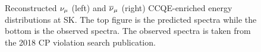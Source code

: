 \begin{figure}
\begin{centering}
\par\end{centering}
\begin{centering}
\par\end{centering}
\caption[Reconstructed $\numu$ and $\numubar$ CCQE-enriched Energy Distributions
at SK]{Reconstructed $\protect\nu_{\mu}$ (left) and $\protect\overline{\nu}_{\mu}$ (right)
CCQE-enriched energy distributions at SK. The top figure is the predicted
spectra while the bottom is the observed spectra. The observed spectra
is taken from the 2018 CP violation search publication\cite{Abe:2018wpn}.
\label{fig:Predicted-reconstructed-neutrino}}
\end{figure}


